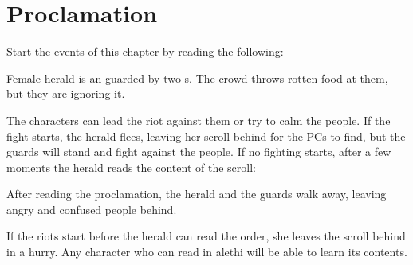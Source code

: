 \section{Proclamation}

Start the events of this chapter by reading the following:


Female herald is an \enemyExpert{} guarded by two \enemyQueensGuard{}s. The crowd throws rotten food at them, but they are ignoring it.

The characters can lead the riot against them or try to calm the people. If the fight starts, the herald flees, leaving her scroll behind for the PCs to find, but the guards will stand and fight against the people. If no fighting starts, after a few moments the herald reads the content of the scroll:


After reading the proclamation, the herald and the guards walk away, leaving angry and confused people behind.

If the riots start before the herald can read the order, she leaves the scroll behind in a hurry. Any character who can read in alethi will be able to learn its contents.

